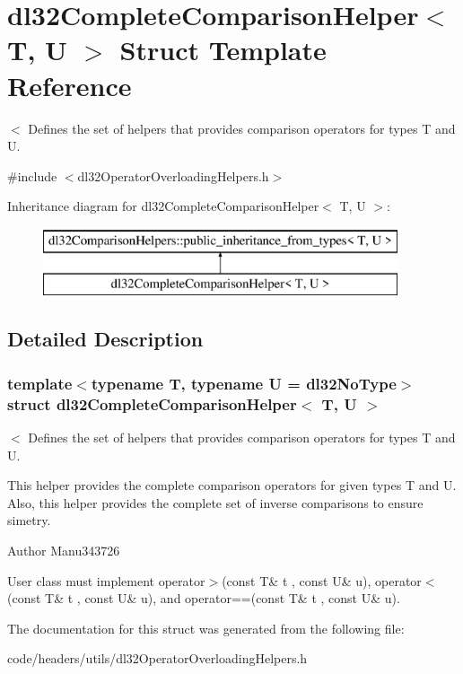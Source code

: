 \hypertarget{structdl32_complete_comparison_helper}{\section{dl32\-Complete\-Comparison\-Helper$<$ T, U $>$ Struct Template Reference}
\label{structdl32_complete_comparison_helper}
}


$<$ Defines the set of helpers that provides comparison operators for types T and U.  




{\ttfamily \#include $<$dl32\-Operator\-Overloading\-Helpers.\-h$>$}

Inheritance diagram for dl32\-Complete\-Comparison\-Helper$<$ T, U $>$\-:\begin{figure}[H]
\begin{center}
\leavevmode
\includegraphics[height=2.000000cm]{structdl32_complete_comparison_helper}
\end{center}
\end{figure}


\subsection{Detailed Description}
\subsubsection*{template$<$typename T, typename U = dl32\-No\-Type$>$struct dl32\-Complete\-Comparison\-Helper$<$ T, U $>$}

$<$ Defines the set of helpers that provides comparison operators for types T and U. 

This helper provides the complete comparison operators for given types T and U. Also, this helper provides the complete set of inverse comparisons to ensure simetry.

\begin{DoxyAuthor}{Author}
Manu343726
\end{DoxyAuthor}
User class must implement operator$>$(const T\& t , const U\& u), operator$<$(const T\& t , const U\& u), and operator==(const T\& t , const U\& u). 

The documentation for this struct was generated from the following file\-:\begin{DoxyCompactItemize}
\item 
code/headers/utils/dl32\-Operator\-Overloading\-Helpers.\-h\end{DoxyCompactItemize}
